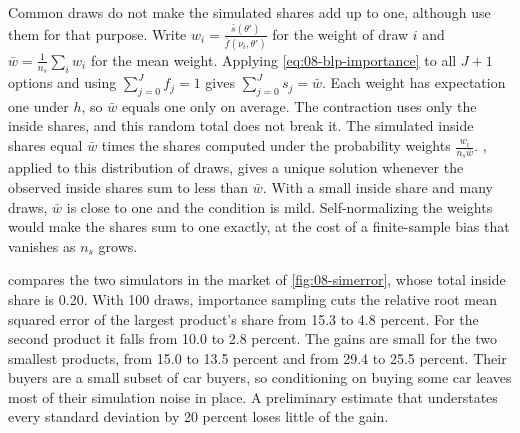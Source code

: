 Common draws do not make the simulated shares add up to one, although \citet[p.~867]{BerryLevinsohnPakes1995} use
them for that purpose. Write $w_i = \frac{\bar s(\theta')}{\bar f(\nu_i, \theta')}$ for the weight of draw $i$ and
$\bar w = \frac{1}{n_s}\sum_{i} w_i$ for the mean weight. Applying \eqref{eq:08-blp-importance} to all $J + 1$
options and using $\sum_{j=0}^{J} f_j = 1$ gives $\sum_{j=0}^{J} s_j = \bar w$. Each weight has expectation one under
$h$, so $\bar w$ equals one only on average. The contraction uses only the inside shares, and this random total does
not break it. The simulated inside shares equal $\bar w$ times the shares computed under the probability weights
$\frac{w_i}{n_s\bar w}$. , applied to this distribution of draws, gives a unique solution
whenever the observed inside shares sum to less than $\bar w$. With a small inside share and many draws, $\bar w$ is
close to one and the condition is mild. Self-normalizing the weights would make the shares sum to one exactly, at
the cost of a finite-sample bias that vanishes as $n_s$ grows.

 compares the two simulators in the market of \cref{fig:08-simerror}, whose total inside share
is 0.20. With 100 draws, importance sampling cuts the relative root mean squared error of the largest product's share
from 15.3 to 4.8 percent. For the second product it falls from 10.0 to 2.8 percent. The gains are small for
the two smallest products, from 15.0 to 13.5 percent and from 29.4 to 25.5 percent. Their buyers are a small subset of
car buyers, so conditioning on buying some car leaves most of their simulation noise in place. A preliminary
estimate that understates every standard deviation by 20 percent loses little of the gain.

